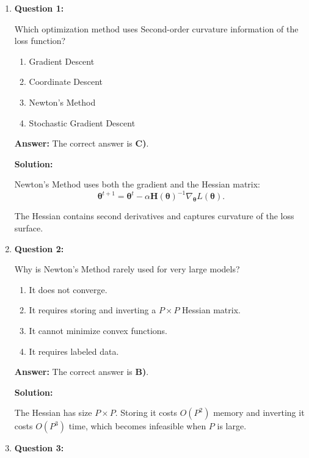 \documentclass{article}
\newcommand{\vecb}[1]{\boldsymbol{#1}} %
\newcommand{\matb}[1]{\mathbf{#1}}     %
\begin{document}
\begin{enumerate}

\item \textbf{Question 1:}

Which optimization method uses Second-order curvature information of the loss function?

\begin{enumerate}
    \item Gradient Descent
    \item Coordinate Descent
    \item Newton’s Method
    \item Stochastic Gradient Descent
\end{enumerate}

\textbf{Answer:} The correct answer is \textbf{C)}.

\textbf{Solution:}

Newton’s Method uses both the gradient and the Hessian matrix:
\[
\vecb{\theta}^{t+1}
=
\vecb{\theta}^{t}
-\alpha \matb{H}(\vecb{\theta})^{-1}
\nabla_{\vecb{\theta}} L(\vecb{\theta}).
\]

The Hessian contains second derivatives and captures curvature of the loss surface.

\vspace{6pt}

\item \textbf{Question 2:}

Why is Newton’s Method rarely used for very large models?

\begin{enumerate}
    \item It does not converge.
    \item It requires storing and inverting a $P\times P$ Hessian matrix.
    \item It cannot minimize convex functions.
    \item It requires labeled data.
\end{enumerate}

\textbf{Answer:} The correct answer is \textbf{B)}.

\textbf{Solution:}

The Hessian has size $P\times P$.  
Storing it costs $O(P^2)$ memory and inverting it costs $O(P^3)$ time, which becomes infeasible when $P$ is large.

\vspace{6pt}

\item \textbf{Question 3:}


\end{enumerate}
\end{document}
